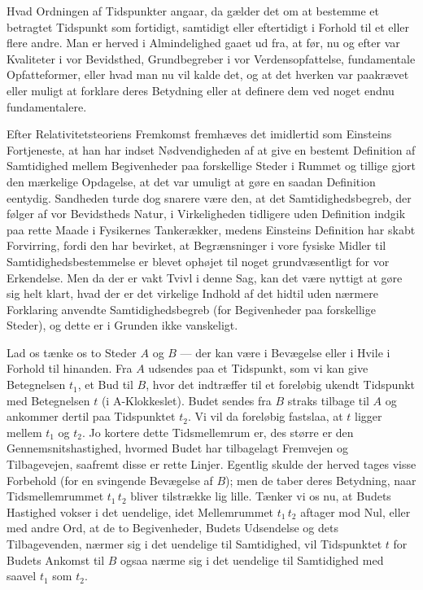 \documentclass[12pt,a4paper]{article}
\newcommand{\opage}[1]{\marginnote{\footnotesize\textit{[#1]}}}
\begin{document}
Hvad Ordningen af Tidspunkter angaar, da gælder det om at bestemme et betragtet
Tidspunkt som fortidigt, samtidigt eller eftertidigt i Forhold til et eller
flere andre. Man er herved i Almindelighed gaaet ud fra, at før, nu og efter
var \guillemotleft Kvaliteter i vor Bevidsthed\guillemotright, Grundbegreber i
vor Verdensopfattelse, fundamentale Opfatteformer, eller hvad man nu vil kalde
det, og at det hverken var paakrævet eller muligt at forklare deres Betydning
eller at definere dem ved noget endnu fundamentalere.

Efter Relativitetsteoriens Fremkomst fremhæves det imidlertid som Einsteins
Fortjeneste, at han har indset Nødvendigheden af at give en bestemt Definition
af Samtidighed mellem Begivenheder paa forskellige Steder i Rummet og tillige
gjort den mærkelige Opdagelse, at det var umuligt at gøre en saadan Definition
eentydig. Sandheden turde dog snarere være den, at det Samtidighedsbegreb, der
følger af vor Bevidstheds Natur, i Virkeligheden tidligere uden Definition
indgik paa rette Maade i Fysikernes Tankerækker, medens Einsteins Definition
har skabt Forvirring, fordi den har bevirket, at Begrænsninger i vore fysiske
Midler til Samtidighedsbestemmelse er blevet ophøjet til noget grundvæsentligt
for vor Erkendelse. Men da der er vakt Tvivl i denne Sag, kan det være nyttigt
at gøre sig helt klart, hvad der er det virkelige Indhold af det hidtil uden
nærmere Forklaring anvendte Samtidighedsbegreb (for Begivenheder paa
forskellige Steder), og dette er i Grunden ikke vanskeligt.

Lad os tænke os to Steder $A$ og $B$ --- der kan være i Bevægelse eller i Hvile
i Forhold til hinanden. Fra $A$ udsendes paa et Tidspunkt, som vi kan give
Betegnelsen $t_{1}$, et Bud til $B$, hvor det indtræffer til et foreløbig
ukendt Tidspunkt med Betegnelsen $t$ (i A-Klokkeslet). Budet sendes fra $B$
straks tilbage til $A$ og ankommer dertil paa Tidspunktet $t_{2}$. Vi vil da
foreløbig fastslaa, at $t$ ligger mellem $t_{1}$ og $t_{2}$. Jo kortere dette
Tidsmellemrum er, des større er den Gennemsnitshastighed, hvormed Budet har
tilbagelagt Fremvejen og Tilbagevejen, saafremt disse er rette Linjer. Egentlig
skulde der herved tages visse Forbehold (for en svingende Bevægelse af $B$);
men de taber deres Betydning, naar Tidsmellemrummet $t_{1}\,t_{2}$ bliver
tilstrække\-%
\opage{3}lig lille. Tænker vi os nu, at Budets Hastighed vokser i det uendelige, idet
Mellemrummet $t_{1}\,t_{2}$ aftager mod Nul, eller med andre Ord, at de to
Begivenheder, Budets Udsendelse og dets Tilbagevenden, nærmer sig i det
uendelige til Samtidighed, vil Tidspunktet $t$ for Budets Ankomst til $B$ ogsaa
nærme sig i det uendelige til Samtidighed med saavel $t_{1}$ som $t_{2}$.
\end{document}
